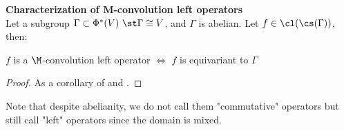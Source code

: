 \begin{corollary}\textbf{Characterization of M-convolution left operators}\\
Let a subgroup $\Gamma \subset \Phi^*(V)~\st \Gamma \cong V$, and $\Gamma$ is abelian. Let $f \in \cl(\cs(\Gamma))$, then:\\
\centerline{$f$ is a $\M$-convolution left operator $\Leftrightarrow$ $f$ is equivariant to $\Gamma$}
\label{cor:equiM}
\end{corollary}
\begin{proof}As a corollary of  and .
\end{proof}

\begin{remark}
Note that despite abelianity, we do not call them "commutative" operators but still call "left" operators since the domain is mixed.
\end{remark}






